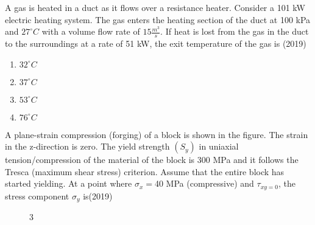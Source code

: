     \item A gas is heated in a duct as it flows over a resistance heater. Consider a 101 kW electric heating system. The gas enters the heating section of the duct at 100 kPa and $27^{\circ}C$ with a volume flow rate of $15 \frac{m^3}{s}$. If heat is lost from the gas in the duct to the surroundings at a rate of 51 kW, the exit temperature of the gas is \hfill (2019)
    \begin{enumerate}[label=(\Alph*)]
        \item $32^{\circ}C$
        \item $37^{\circ}C$
        \item $53^{\circ}C$
        \item $76^{\circ}C$
    \end{enumerate}
    \item A plane-strain compression (forging) of a block is shown in the figure. The strain in the z-direction is zero. The yield strength $(S_y)$ in uniaxial tension/compression of the material of the block is 300 MPa and it follows the Tresca (maximum shear stress) criterion. Assume that the entire block has started yielding. At a point where $\sigma_x =$40 MPa (compressive) and $\tau_{xy = 0}$,  the stress component $\sigma_y$ is\hfill (2019)
    \begin{figure}[!ht]
        \centering
        \caption{3}
    \end{figure}
